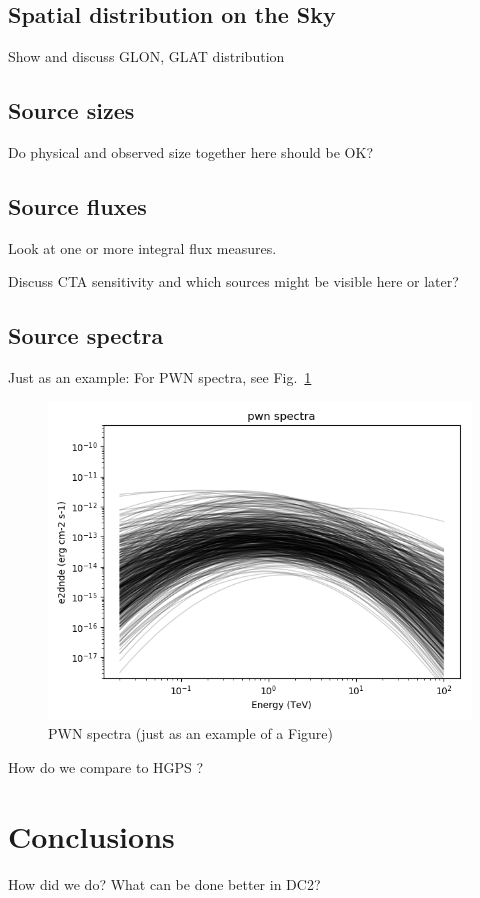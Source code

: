 \documentclass{article}
\begin{document}
\subsection{Spatial distribution on the Sky}

Show and discuss GLON, GLAT distribution

\subsection{Source sizes}

Do physical and observed size together here should be OK?

\subsection{Source fluxes}

Look at one or more integral flux measures.

Discuss CTA sensitivity and which sources might be visible here or later?

\subsection{Source spectra}

Just as an example: For PWN spectra, see Fig.~\ref{fig:pwn_spec}

\begin{figure}[t]
\begin{center}
\includegraphics[width=1.0\textwidth]
{../sky_model_checks/ctadc_skymodel_gps_sources_spectra_pwn}
\caption{PWN spectra (just as an example of a Figure)}
\label{fig:pwn_spec}
\end{center}
\end{figure}


How do we compare to HGPS \citep{2013arXiv1307.4868C}?

\section{Conclusions}

How did we do? What can be done better in DC2?





\end{document}

